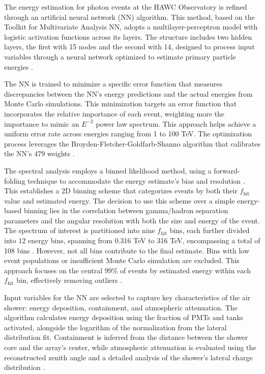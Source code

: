 The energy estimation for photon events at the HAWC Observatory is refined through an artificial neural network (NN) algorithm.
This method, based on the Toolkit for Multivariate Analysis NN, adopts a multilayer-perceptron model with logistic activation functions across its layers.
The structure includes two hidden layers, the first with 15 nodes and the second with 14, designed to process input variables through a neural network optimized to estimate primary particle energies \cite{thesis_SamM}.

The NN is trained to minimize a specific error function that measures discrepancies between the NN's energy predictions and the actual energies from Monte Carlo simulations.
This minimization targets an error function that incorporates the relative importance of each event, weighting more the importance to mimic an $E^{-2}$ power law spectrum.
This approach helps achieve a uniform error rate across energies ranging from 1 to 100 TeV.
The optimization process leverages the Broyden-Fletcher-Goldfarb-Shanno algorithm that calibrates the NN's 479 weights \cite{100TEV_Crab_HAWC}.

The spectral analysis employs a binned likelihood method, using a forward-folding technique to accommodate the energy estimate's bias and resolution \cite{100TEV_Crab_HAWC}.
This establishes a 2D binning scheme that categorizes events by both their $f_{\text{hit}}$ value and estimated energy.
The decision to use this scheme over a simple energy-based binning lies in the correlation between gamma/hadron separation parameters and the angular resolution with both the size and energy of the event.
The spectrum of interest is partitioned into nine $f_{\text{hit}}$ bins, each further divided into 12 energy bins, spanning from 0.316 TeV to 316 TeV, encompassing a total of 108 bins \cite{100TEV_Crab_HAWC}.
However, not all bins contribute to the final estimate.
Bins with low event populations or insufficient Monte Carlo simulation are excluded.
This approach focuses on the central 99\% of events by estimated energy within each $f_{\text{hit}}$ bin, effectively removing outliers \cite{100TEV_Crab_HAWC}.

Input variables for the NN are selected to capture key characteristics of the air shower: energy deposition, containment, and atmospheric attenuation.
The algorithm calculates energy deposition using the fraction of PMTs and tanks activated, alongside the logarithm of the normalization from the lateral distribution fit.
Containment is inferred from the distance between the shower core and the array's center, while atmospheric attenuation is evaluated using the reconstructed zenith angle and a detailed analysis of the shower's lateral charge distribution \cite{thesis_SamM,100TEV_Crab_HAWC}.

